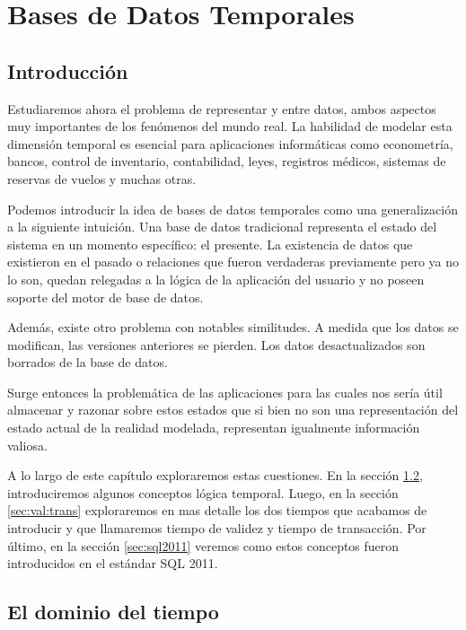 \chapter{Bases de Datos Temporales}  \label{cap:t}

\section{Introducción}

Estudiaremos ahora el problema de representar  y  entre datos,
ambos aspectos muy importantes de los fenómenos del mundo real.
La habilidad de modelar esta dimensión temporal es esencial para aplicaciones informáticas como
econometría, bancos, control de inventario, contabilidad, leyes, registros médicos, sistemas de reservas de vuelos y muchas otras.

Podemos introducir la idea de bases de datos temporales como una generalización a la siguiente intuición.
Una base de datos tradicional representa el estado del sistema en un momento específico: el presente.
La existencia de datos que existieron en el pasado o relaciones que fueron verdaderas previamente pero ya no lo son,
quedan relegadas a la lógica de la aplicación del usuario y no poseen soporte del motor de base de datos.

Además, existe otro problema con notables similitudes. A medida que los datos se modifican, las versiones anteriores se pierden.
Los datos desactualizados son borrados de la base de datos.

Surge entonces la problemática de las aplicaciones para las cuales nos sería útil almacenar y razonar sobre estos estados que
si bien no son una representación del estado actual de la realidad modelada, representan igualmente información valiosa.

A lo largo de este capítulo exploraremos estas cuestiones.
En la sección \ref{sec:dominio:tiempo}, introduciremos algunos conceptos lógica temporal.
Luego, en la sección \ref{sec:val:trans} exploraremos en mas detalle los dos tiempos que acabamos de introducir
y que llamaremos tiempo de validez y tiempo de transacción.
Por último, en la sección \ref{sec:sql2011} veremos como estos conceptos fueron introducidos en el estándar SQL 2011.

\section{El dominio del tiempo}\label{sec:dominio:tiempo}

